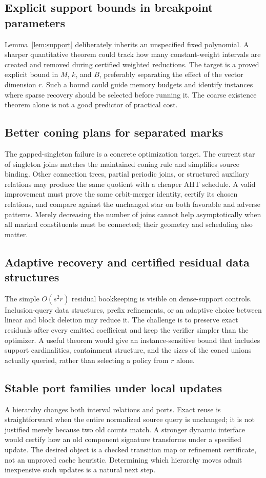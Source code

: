 \documentclass[11pt,letterpaper]{article}
\theoremstyle{definition}\newtheorem{definition}[theorem]{Definition}
\theoremstyle{remark}\newtheorem{remark}[theorem]{Remark}
\begin{document}
\subsection{Explicit support bounds in breakpoint parameters}
Lemma~\ref{lem:support} deliberately inherits an unspecified fixed polynomial. A sharper quantitative theorem could track how many constant-weight intervals are created and removed during certified weighted reductions. The target is a proved explicit bound in $M$, $k$, and $B$, preferably separating the effect of the vector dimension $r$. Such a bound could guide memory budgets and identify instances where sparse recovery should be selected before running it. The coarse existence theorem alone is not a good predictor of practical cost.

\subsection{Better coning plans for separated marks}
The gapped-singleton failure is a concrete optimization target. The current star of singleton joins matches the maintained coning rule and simplifies source binding. Other connection trees, partial periodic joins, or structured auxiliary relations may produce the same quotient with a cheaper AHT schedule. A valid improvement must prove the same orbit-merger identity, certify its chosen relations, and compare against the unchanged star on both favorable and adverse patterns. Merely decreasing the number of joins cannot help asymptotically when all marked constituents must be connected; their geometry and scheduling also matter.

\subsection{Adaptive recovery and certified residual data structures}
The simple $O(s^2r)$ residual bookkeeping is visible on dense-support controls. Inclusion-query data structures, prefix refinements, or an adaptive choice between linear and block deletion may reduce it. The challenge is to preserve exact residuals after every emitted coefficient and keep the verifier simpler than the optimizer. A useful theorem would give an instance-sensitive bound that includes support cardinalities, containment structure, and the sizes of the coned unions actually queried, rather than selecting a policy from $r$ alone.

\subsection{Stable port families under local updates}
A hierarchy changes both interval relations and ports. Exact reuse is straightforward when the entire normalized source query is unchanged; it is not justified merely because two old counts match. A stronger dynamic interface would certify how an old component signature transforms under a specified update. The desired object is a checked transition map or refinement certificate, not an unproved cache heuristic. Determining which hierarchy moves admit inexpensive such updates is a natural next step.
\end{document}
